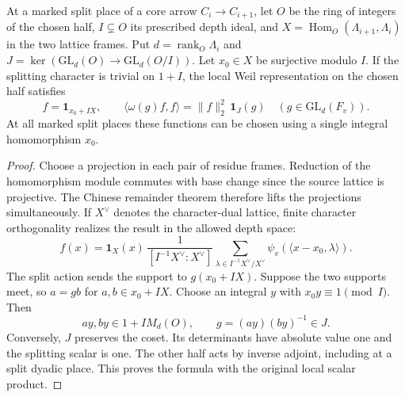 \begin{auxlemma}\label{lem:fitted-split-row-projector}
At a marked split place of a core arrow
\(C_i\to C_{i+1}\), let \(O\) be the ring of integers of the chosen
half, \(I\subsetneq O\) its prescribed depth ideal, and
\(X=\operatorname{Hom}_O(\Lambda_{i+1},\Lambda_i)\) in the two
lattice frames. Put \(d=\operatorname{rank}_O\Lambda_i\) and
\(J=\ker(\mathrm{GL}_d(O)\to\mathrm{GL}_d(O/I))\).
Let \(x_0\in X\) be surjective modulo \(I\). If the splitting
character is trivial on \(1+I\), the local Weil representation
on the chosen half satisfies
\[
 f=\mathbf1_{x_0+IX},\qquad
 \langle\omega(g)f,f\rangle=\|f\|_2^2\,\mathbf1_J(g)
       \quad (g\in\mathrm{GL}_d(F_v)).
\]
At all marked split places these functions can be chosen using a
single integral homomorphism \(x_0\).
\end{auxlemma}
\begin{proof}
Choose a projection in each pair of residue frames. Reduction of the
homomorphism module commutes with base change since the source lattice
is projective. The Chinese remainder theorem therefore lifts the
projections simultaneously. If \(X^\vee\) denotes the character-dual
lattice, finite character orthogonality realizes the result in the
allowed depth space:
\[
 f(x)=\mathbf1_X(x)\,
       \frac{1}{[I^{-1}X^\vee:X^\vee]}
       \sum_{\lambda\in I^{-1}X^\vee/X^\vee}
                         \psi_v(\langle x-x_0,\lambda\rangle).
\]
The split action sends the support to \(g(x_0+IX)\). Suppose the
two supports meet, so \(a=gb\) for \(a,b\in x_0+IX\).
Choose an integral \(y\) with \(x_0 y\equiv 1\pmod I\). Then
\[
     ay,by\in 1+I M_d(O),\qquad g=(ay)(by)^{-1}\in J .
\]
Conversely, \(J\) preserves the coset. Its determinants have absolute
value one and the splitting scalar is one. The other half acts by
inverse adjoint, including at a split dyadic place. This proves the
formula with the original local scalar product.
\end{proof}

